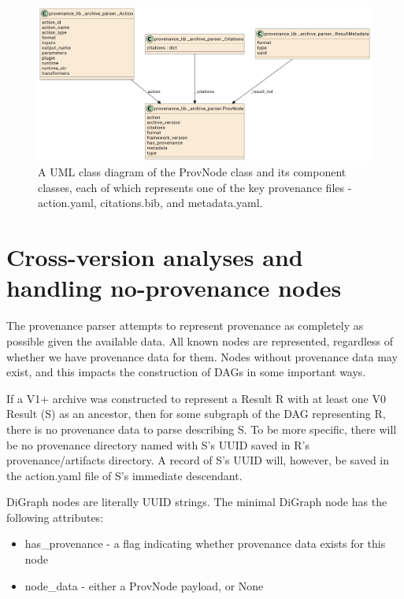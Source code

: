 \begin{figure}[htp]
\centering
\includegraphics[width=\textwidth]{figures/ProvNode_UML.png}
\caption[UML Class diagram of the ProvNode class and its components]%
{A UML class diagram of the ProvNode class and its component classes, each of
which represents one of the key provenance files - action.yaml, citations.bib,
and metadata.yaml.}
\label{fig:ProvNode_UML}
\end{figure}

\section{Cross-version analyses and handling no-provenance nodes}

The provenance parser attempts to represent provenance as completely as possible
given the available data. All known nodes are represented, regardless of whether
we have provenance data for them. Nodes without provenance data may exist, and
this impacts the construction of DAGs in some important ways.

If a V1+ archive was constructed to represent a Result R with at least one V0
Result (S) as an ancestor, then for some subgraph of the DAG representing R,
there is no provenance data to parse describing S. To be more specific, there
will be no provenance directory named with S’s UUID saved in R’s
provenance/artifacts directory. A record of S’s UUID will, however, be saved in
the action.yaml file of S’s immediate descendant.

DiGraph nodes are literally UUID strings. The minimal DiGraph node has the
following attributes:
\begin{itemize}
    \item has\_provenance - a flag indicating whether provenance data exists for this node
    \item node\_data - either a ProvNode payload, or None
\end{itemize}

